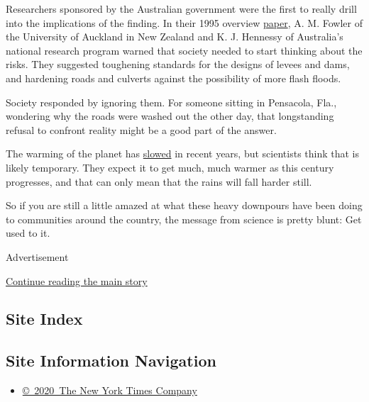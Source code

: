 Researchers sponsored by the Australian government were the first to
really drill into the implications of the finding. In their 1995
overview \href{http://tinyurl.com/mmcmr7z}{paper}, A. M. Fowler of the
University of Auckland in New Zealand and K. J. Hennessy of Australia's
national research program warned that society needed to start thinking
about the risks. They suggested toughening standards for the designs of
levees and dams, and hardening roads and culverts against the
possibility of more flash floods.

Society responded by ignoring them. For someone sitting in Pensacola,
Fla., wondering why the roads were washed out the other day, that
longstanding refusal to confront reality might be a good part of the
answer.

The warming of the planet has
\href{http://www.nytimes3xbfgragh.onion/2013/06/11/science/earth/what-to-make-of-a-climate-change-plateau.html}{slowed}
in recent years, but scientists think that is likely temporary. They
expect it to get much, much warmer as this century progresses, and that
can only mean that the rains will fall harder still.

So if you are still a little amazed at what these heavy downpours have
been doing to communities around the country, the message from science
is pretty blunt: Get used to it.

Advertisement

\protect\hyperlink{after-bottom}{Continue reading the main story}

\hypertarget{site-index}{%
\subsection{Site Index}\label{site-index}}

\hypertarget{site-information-navigation}{%
\subsection{Site Information
Navigation}\label{site-information-navigation}}

\begin{itemize}
\tightlist
\item
  \href{https://help.nytimes3xbfgragh.onion/hc/en-us/articles/115014792127-Copyright-notice}{©~2020~The
  New York Times Company}
\end{itemize}


